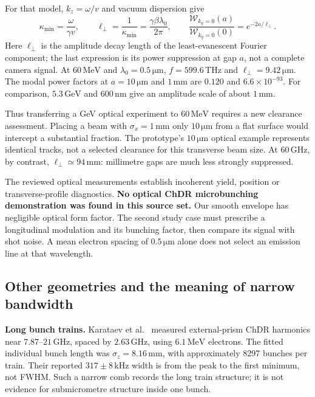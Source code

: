 \documentclass[11pt,a4paper]{article}
\newcommand{\unit}[1]{\,\mathrm{#1}}
\numberwithin{equation}{section}
\begin{document}
For that model, \(k_z=\omega/v\) and vacuum dispersion give
\begin{equation}
 \kappa_{\min}=\frac{\omega}{\gamma v},\qquad
 \ell_\perp=\frac{1}{\kappa_{\min}}
 =\frac{\gamma\beta\lambda_0}{2\pi},\qquad
 \frac{\mathcal W_{k_y=0}(a)}{\mathcal W_{k_y=0}(0)}
 =e^{-2a/\ell_\perp}.
 \label{eq:optical-gap-comparison}
\end{equation}
Here \(\ell_\perp\) is the amplitude decay length of the least-evanescent
Fourier component; the last expression is its power suppression at gap
\(a\), not a complete camera signal. At \(60\unit{MeV}\) and
\(\lambda_0=0.5\unit{\mu m}\),
\(f=599.6\unit{THz}\) and \(\ell_\perp=9.42\unit{\mu m}\).
The modal power factors at \(a=10\unit{\mu m}\) and
\(1\unit{mm}\) are \(0.120\) and \(6.6\times10^{-93}\).
For comparison, \(5.3\unit{GeV}\) and \(600\unit{nm}\) give an
amplitude scale of about \(1\unit{mm}\).

Thus transferring a GeV optical experiment to \(60\unit{MeV}\) requires
a new clearance assessment. Placing a beam with \(\sigma_x=1\unit{mm}\)
only \(10\unit{\mu m}\) from a flat surface would intercept a substantial
fraction. The prototype's \(10\unit{\mu m}\) optical example represents
identical tracks, not a selected clearance for this transverse beam size.
At \(60\unit{GHz}\), by contrast, \(\ell_\perp\simeq94\unit{mm}\):
millimetre gaps are much less strongly suppressed.

The reviewed optical measurements establish incoherent yield, position
or transverse-profile diagnostics. \textbf{No optical ChDR microbunching
demonstration was found in this source set.} Our smooth envelope has
negligible optical form factor. The second study case must prescribe a
longitudinal modulation and its bunching factor, then compare its signal
with shot noise. A mean electron spacing of \(0.5\unit{\mu m}\) alone
does not select an emission line at that wavelength.

\clearpage
\subsection{Other geometries and the meaning of narrow bandwidth}

\textbf{Long bunch trains.}
Karataev et al.~\cite{karataev2020superradiant} measured external-prism
ChDR harmonics near \(7.87\)--\(21\unit{GHz}\), spaced by
\(2.63\unit{GHz}\), using \(6.1\unit{MeV}\) electrons.
The fitted individual bunch length was \(\sigma_z=8.16\unit{mm}\),
with approximately 8297 bunches per train. Their reported
\(317\pm8\unit{kHz}\) width is from the peak to the first minimum,
not FWHM. Such a narrow comb records the long train structure; it is
not evidence for submicrometre structure inside one bunch.
\end{document}
